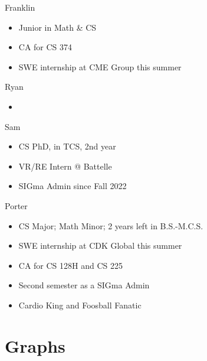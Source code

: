 \documentclass[aspectratio=169, handout]{beamer}
\begin{document}
\begin{frame}{Franklin}
    \begin{itemize}
        \item Junior in Math \& CS
        \item CA for CS 374
        \item SWE internship at CME Group this summer
    \end{itemize}
\end{frame}


\begin{frame}{Ryan}
    \begin{itemize}
        \item 
    \end{itemize}
\end{frame}


\begin{frame}{Sam}
    \begin{itemize}
        \item CS PhD, in TCS, 2nd year
        \item VR/RE Intern @ Battelle
        \item SIGma Admin since Fall 2022
    \end{itemize}
\end{frame}


\begin{frame}{Porter}
    \begin{itemize}
        \item CS Major; Math Minor; 2 years left in B.S.-M.C.S.
        \item SWE internship at CDK Global this summer
        \item CA for CS 128H and CS 225
        \item Second semester as a SIGma Admin
        \item Cardio King and Foosball Fanatic
    \end{itemize}
\end{frame}



\section{Graphs}
\frame{\sectionpage}
\end{document}
